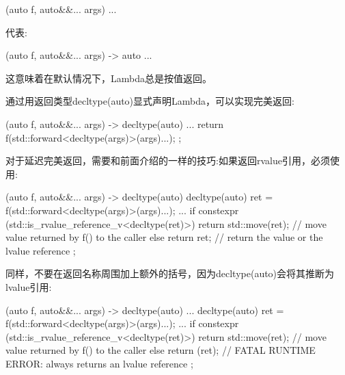 \begin{cppcode}
[] (auto f, auto&&... args) {
	...
}
\end{cppcode}

代表:

\begin{cppcode}
[] (auto f, auto&&... args) -> auto {
	...
}
\end{cppcode}

这意味着在默认情况下，Lambda总是按值返回。

通过用返回类型decltype(auto)显式声明Lambda，可以实现完美返回:

\begin{cppcode}
[] (auto f, auto&&... args) -> decltype(auto) {
	...
	return f(std::forward<decltype(args)>(args)...);
};
\end{cppcode}

对于延迟完美返回，需要和前面介绍的一样的技巧:如果返回rvalue引用，必须使用:

\begin{cppcode}
[] (auto f, auto&&... args) -> decltype(auto) {
	decltype(auto) ret = f(std::forward<decltype(args)>(args)...);
	...
	if constexpr (std::is_rvalue_reference_v<decltype(ret)>) {
		return std::move(ret); // move value returned by f() to the caller
	}
	else {
		return ret; // return the value or the lvalue reference
	}
};
\end{cppcode}

同样，不要在返回名称周围加上额外的括号，因为decltype(auto)会将其推断为lvalue引用:

\begin{cppcode}
[] (auto f, auto&&... args) -> decltype(auto) {
	...
	decltype(auto) ret = f(std::forward<decltype(args)>(args)...);
	...
	if constexpr (std::is_rvalue_reference_v<decltype(ret)>) {
		return std::move(ret); // move value returned by f() to the caller
	}
	else {
		return (ret); // FATAL RUNTIME ERROR: always returns an lvalue reference
	}
};
\end{cppcode}










